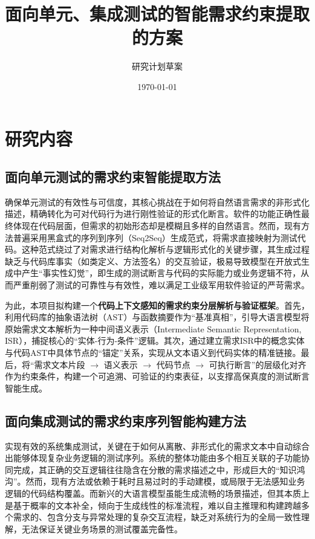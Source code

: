 \documentclass[12pt]{article}
\title{面向单元、集成测试的智能需求约束提取的方案}
\author{研究计划草案}
\date{\today}
\begin{document}
\maketitle

\tableofcontents
\newpage

\section{研究内容}

\subsection{面向单元测试的需求约束智能提取方法}

确保单元测试的有效性与可信度，其核心挑战在于如何将自然语言需求的非形式化描述，精确转化为可对代码行为进行刚性验证的形式化断言。软件的功能正确性最终体现在代码层面，但需求的初始形态却是模糊且多样的自然语言。然而，现有方法普遍采用黑盒式的序列到序列（Seq2Seq）生成范式，将需求直接映射为测试代码。这种范式绕过了对需求进行结构化解析与逻辑形式化的关键步骤，其生成过程缺乏与代码库事实（如类定义、方法签名）的交互验证，极易导致模型在开放式生成中产生“事实性幻觉”，即生成的测试断言与代码的实际能力或业务逻辑不符，从而严重削弱了测试的可靠性与有效性，难以满足工业级军用软件验证的严苛需求。

为此，本项目拟构建一个\textbf{代码上下文感知的需求约束分层解析与验证框架}。首先，利用代码库的抽象语法树（AST）与函数摘要作为“基准真相”，引导大语言模型将原始需求文本解析为一种中间语义表示（Intermediate Semantic Representation, ISR），捕捉核心的“实体-行为-条件”逻辑。其次，通过建立需求ISR中的概念实体与代码AST中具体节点的“锚定”关系，实现从文本语义到代码实体的精准链接。最后，将“需求文本片段 $\rightarrow$ 语义表示 $\rightarrow$ 代码节点 $\rightarrow$ 可执行断言”的层级化对齐作为约束条件，构建一个可追溯、可验证的约束表征，以支撑高保真度的测试断言智能生成。

\subsection{面向集成测试的需求约束序列智能构建方法}

实现有效的系统集成测试，关键在于如何从离散、非形式化的需求文本中自动综合出能够体现复杂业务逻辑的测试序列。系统的整体功能由多个相互关联的子功能协同完成，其正确的交互逻辑往往隐含在分散的需求描述之中，形成巨大的“知识鸿沟”。然而，现有方法或依赖于耗时且易过时的手动建模，或局限于无法感知业务逻辑的代码结构覆盖。而新兴的大语言模型虽能生成流畅的场景描述，但其本质上是基于概率的文本补全，倾向于生成线性的标准流程，难以自主推理和构建跨越多个需求的、包含分支与异常处理的复杂交互流程，缺乏对系统行为的全局一致性理解，无法保证关键业务场景的测试覆盖完备性。
\end{document}
